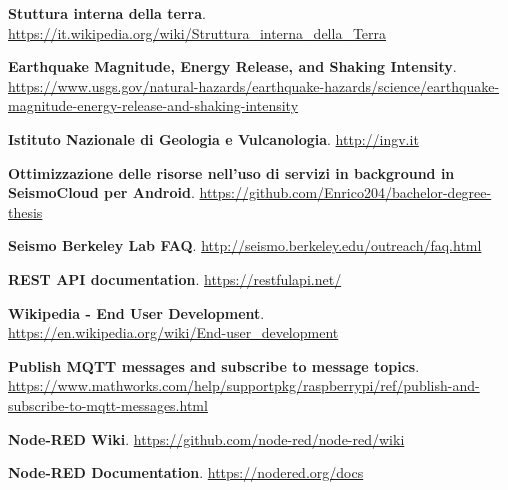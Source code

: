 \documentclass[a4paper,10pt]{memoir}
\begin{document}
\begin{thebibliography}{9}

  \textbf{Stuttura interna della terra}.\\
  \href{https://it.wikipedia.org/wiki/Struttura_interna_della_Terra}{https://it.wikipedia.org/wiki/Struttura\_interna\_della\_Terra}

  \textbf{Earthquake Magnitude, Energy Release, and Shaking Intensity}.\\
  \href{https://www.usgs.gov/natural-hazards/earthquake-hazards/science/earthquake-magnitude-energy-release-and-shaking-intensity}{https://www.usgs.gov/natural-hazards/earthquake-hazards/science/earthquake-magnitude-energy-release-and-shaking-intensity}

  \textbf{Istituto Nazionale di Geologia e Vulcanologia}.
  \href{http://ingv.it}{http://ingv.it}

  \textbf{Ottimizzazione delle risorse nell’uso di servizi in background in SeismoCloud per Android}.
  \href{https://github.com/Enrico204/bachelor-degree-thesis}{https://github.com/Enrico204/bachelor-degree-thesis}

  \textbf{Seismo Berkeley Lab FAQ}.
  \href{http://seismo.berkeley.edu/outreach/faq.html}{http://seismo.berkeley.edu/outreach/faq.html}

  \textbf{REST API documentation}.
  \href{https://restfulapi.net/}{https://restfulapi.net/}

  \textbf{Wikipedia - End User Development}.\\
  \href{https://en.wikipedia.org/wiki/End-user_development}{https://en.wikipedia.org/wiki/End-user\_development}

  \textbf{Publish MQTT messages and subscribe to message topics}.\\
  \href{https://www.mathworks.com/help/supportpkg/raspberrypi/ref/publish-and-subscribe-to-mqtt-messages.html}{https://www.mathworks.com/help/supportpkg/raspberrypi/ref/publish-and-subscribe-to-mqtt-messages.html}

  \textbf{Node-RED Wiki}.
  \href{https://github.com/node-red/node-red/wiki}{https://github.com/node-red/node-red/wiki}

  \textbf{Node-RED Documentation}.
  \href{https://nodered.org/docs}{https://nodered.org/docs}


\end{thebibliography}
\end{document}
